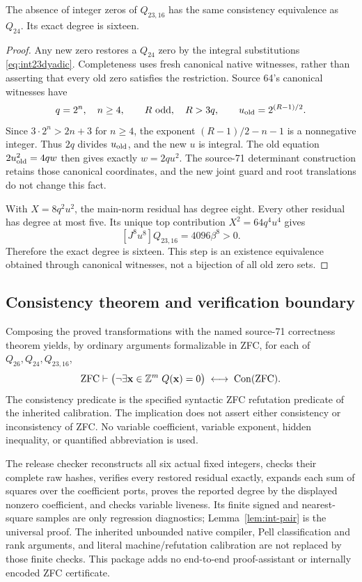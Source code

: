 \begin{proposition}
The absence of integer zeros of $Q_{23,16}$ has the same consistency
equivalence as $Q_{24}$.  Its exact degree is sixteen.
\end{proposition}
\begin{proof}
Any new zero restores a $Q_{24}$ zero by the integral substitutions
\eqref{eq:int23dyadic}.  Completeness uses fresh canonical native witnesses,
rather than asserting that every old zero satisfies the restriction.
Source 64's canonical witnesses have
\[
 q=2^n,\quad n\ge4,\qquad R\text{ odd},\quad R>3q,
 \qquad u_{\rm old}=2^{(R-1)/2}.
\]
Since $3\cdot2^n>2n+3$ for $n\ge4$, the exponent
$(R-1)/2-n-1$ is a nonnegative integer.  Thus $2q$ divides
$u_{\rm old}$, and the new $u$ is integral.  The old equation
$2u_{\rm old}^2=4qw$ then gives exactly $w=2qu^2$.
The source-71 determinant construction retains those canonical coordinates,
and the new joint guard and root translations do not change this fact.

With $X=8q^2u^2$, the main-norm residual has degree eight.  Every other
residual has degree at most five.  Its unique top contribution
$X^2=64q^4u^4$ gives
\[
 [J^8u^8]Q_{23,16}=4096\beta^8>0.
\]
Therefore the exact degree is sixteen.  This step is an existence
equivalence obtained through canonical witnesses, not a bijection of all
old zero sets.
\end{proof}

\subsection{Consistency theorem and verification boundary}

Composing the proved transformations with the named source-71 correctness
theorem yields, by ordinary arguments formalizable in ZFC, for each of
$Q_{26},Q_{24},Q_{23,16}$,
\[
 \mathrm{ZFC}\vdash
 \bigl(\neg\exists\mathbf{x}\in\mathbb Z^m\;Q(\mathbf{x})=0\bigr)
 \;\longleftrightarrow\;\operatorname{Con}(\mathrm{ZFC}).
\]
The consistency predicate is the specified syntactic ZFC refutation
predicate of the inherited calibration.  The implication does not assert
either consistency or inconsistency of ZFC.  No variable coefficient,
variable exponent, hidden inequality, or quantified abbreviation is used.

The release checker reconstructs all six actual fixed integers, checks
their complete raw hashes, verifies every restored residual exactly,
expands each sum of squares over the coefficient ports, proves the
reported degree by the displayed nonzero coefficient, and checks variable
liveness.  Its finite signed and nearest-square samples are only regression
diagnostics; Lemma~\ref{lem:int-pair} is the universal proof.  The inherited
unbounded native compiler, Pell classification and rank arguments, and
literal machine/refutation calibration are not replaced by those finite
checks.  This package adds no end-to-end proof-assistant or internally
encoded ZFC certificate.
